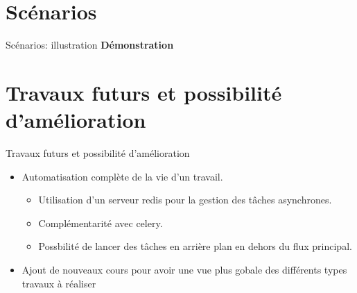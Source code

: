 \documentclass[numbering=fraction]{beamer}
\begin{document}
\section{Scénarios}
\begin{frame}{Scénarios: illustration}
    \centering %
\vfill %
\textbf{\Large Démonstration} %
\vfill %
\end{frame}
\section{Travaux futurs et possibilité d'amélioration}
\begin{frame}{Travaux futurs et possibilité d'amélioration}
    \begin{itemize}
        \item Automatisation complète de la vie d'un travail.
        \begin{itemize}
            \item Utilisation d'un serveur redis pour la gestion des tâches asynchrones.
            \item Complémentarité avec celery.
            \item Possbilité de lancer des tâches en arrière plan en dehors du flux principal.
        \end{itemize}
        \item Ajout de nouveaux cours pour avoir une vue plus gobale des différents types travaux à réaliser
    \end{itemize}
    
\end{frame}
\end{document}
